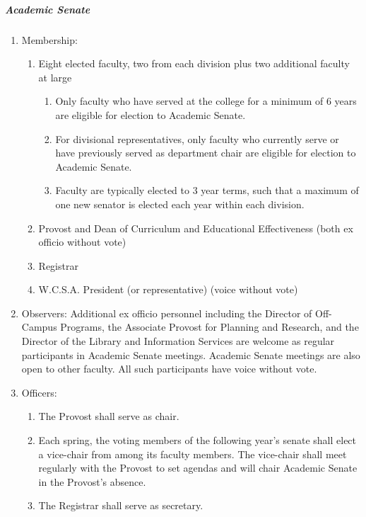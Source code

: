 \documentclass[letterpaper, 11pt]{article}
\begin{document}
				\subparagraph{Academic Senate}
					\begin{enumerate}[label=\alph*)]
						\item{Membership:
							\begin{enumerate}[label=\arabic*)]
								\item{Eight elected faculty, two from each division plus two additional faculty at large
									\begin{enumerate}[label=(\alph*)]
										\item{Only faculty who have served at the college for a minimum of 6 years are eligible for election to Academic Senate.}
										\item{For divisional representatives, only faculty who currently serve or have previously served as department chair are eligible for election to Academic Senate.}
										\item{Faculty are typically elected to 3 year terms, such that a maximum of one new senator is elected each year within each division.}
									\end{enumerate}
								}
								\item{Provost and Dean of Curriculum and Educational Effectiveness (both ex officio without vote)}
								\item{Registrar}
								\item{W.C.S.A. President (or representative) (voice without vote)}
							\end{enumerate}
						}
						\item{Observers:  Additional ex officio personnel including the Director of Off-Campus Programs, the Associate Provost for Planning and Research, and the Director of the Library and Information Services are welcome as regular participants in Academic Senate meetings.  Academic Senate meetings are also open to other faculty.  All such participants have voice without vote.}
						\item{Officers:
							\begin{enumerate}[label=\arabic*)]
								\item{The Provost shall serve as chair.}
								\item{Each spring, the voting members of the following year's senate shall elect a vice-chair from among its faculty members.  The vice-chair shall meet regularly with the Provost to set agendas and will chair Academic Senate in the Provost's absence.}
								\item{The Registrar shall serve as secretary.}
							\end{enumerate}
}
\end{enumerate}
\end{document}
